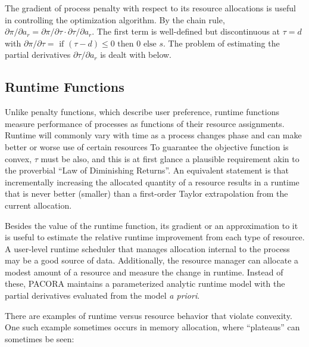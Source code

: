 The gradient of process penalty with respect to its resource allocations is useful in controlling the optimization algorithm.  By the chain rule,
$\partial\pi/\partial a_r = \partial\pi/\partial\tau\cdot\partial\tau/\partial a_r$.
The first term is well-defined but discontinuous at $\tau = d$ with
$\partial\pi/\partial\tau = \mbox{ if } (\tau - d) \leq 0 \mbox{ then } 0 \mbox{ else } s$.
The problem of estimating the partial derivatives $\partial\tau/\partial a_r$ is dealt with below.

\subsection*{Runtime Functions}

Unlike penalty functions, which describe user preference, runtime functions measure performance of processes as functions of their resource assignments.
Runtime will commonly vary with time as a process changes phase and can make better or worse use of certain resources
To guarantee the objective function is convex, $\tau$ must be also,
and this is at first glance a plausible requirement akin to the proverbial ``Law of Diminishing Returns''.
An equivalent statement is that incrementally increasing the allocated quantity of a resource results in a runtime that is never better (smaller) than
a first-order Taylor extrapolation from the current allocation.

Besides the value of the runtime function, its gradient or an approximation to it is useful to estimate the relative runtime improvement from each type of resource.  A user-level runtime scheduler that manages allocation internal to the process may be a good source of data.
Additionally, the resource manager can allocate a modest amount of a resource and measure the change in runtime.
Instead of these, PACORA maintains a parameterized analytic runtime model with the partial derivatives evaluated from the model \emph{a priori}.

There are examples of runtime versus resource behavior that violate convexity.  One such example sometimes occurs in memory allocation, where “plateaus” can sometimes be seen:

